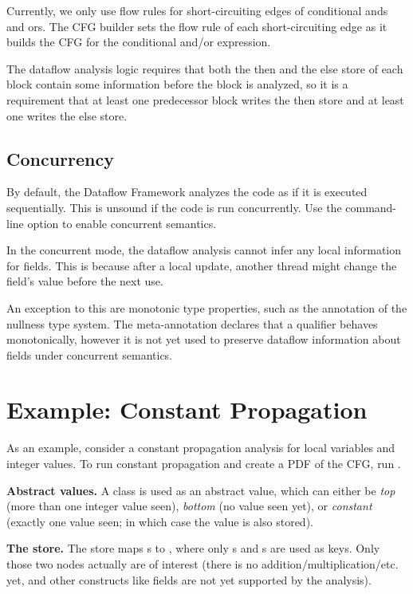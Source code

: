 Currently, we only use flow rules for short-circuiting edges of
conditional ands and ors.  The CFG builder sets the flow rule of each
short-circuiting edge as it builds the CFG for the conditional and/or
expression.

The dataflow analysis logic requires that both the then and the else
store of each block contain some information before the block is
analyzed, so it is a requirement that at least one predecessor block
writes the then store and at least one writes the else store.


\subsection{Concurrency}

By default, the Dataflow Framework analyzes the code as if it is
executed sequentially.  This is unsound if the code is run
concurrently.  Use the  command-line
option to enable concurrent semantics.

In the concurrent mode, the dataflow analysis cannot infer any
local information for fields.  This is because after a local update,
another thread might change the field's value before the next use.

An exception to this are monotonic type properties, such as the
 annotation of the nullness type system.  The
meta-annotation  declares that a qualifier
behaves monotonically, however it is not yet used to preserve dataflow
information about fields under concurrent semantics.


\section{Example: Constant Propagation}

As an example, consider a constant propagation
analysis for local variables and integer values.
To run constant propagation and create a PDF of the CFG, run
.

\textbf{Abstract values.} A class  is used as an
abstract value, which can either be \emph{top} (more than one integer
value seen), \emph{bottom} (no value seen yet), or \emph{constant}
(exactly one value seen; in which case the value is also stored).

\textbf{The store.} The store maps s to ,
where only s and s
are used as keys.  Only those two nodes actually are of interest
(there is no addition/multiplication/etc. yet, and other constructs
like fields are not yet supported by the analysis).

